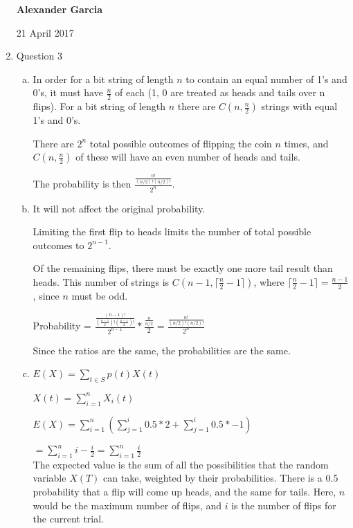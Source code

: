 \documentclass[11pt]{article}
\begin{document}
\begin{enumerate}
\begin{enumerate}[(a)]
			\end{enumerate}
\newpage
\textbf{Alexander Garcia}

21 April 2017 \\

		\item Question 3

			\begin{enumerate}[(a)]

				\item In order for a bit string of length $n$ to contain an equal number of 1's and 0's,
					it must have $\frac{n}{2}$ of each (1, 0 are treated as heads and tails over n flips).
					For a bit string of length $n$ there are $C(n, \frac{n}{2})$ strings with equal 1's and
					0's.

					There are $2^n$ total possible outcomes of flipping the coin $n$ times, and
					$C(n, \frac{n}{2})$ of these will have an even number of heads and tails.

					The probability is then $\frac{\frac{n!}{(n/2)!(n/2)!}}{2^n} $. \\

				\item It will not affect the original probability.

					Limiting the first flip to heads limits the number of total
					possible outcomes to $2^{n-1}$.

					Of the remaining flips, there must be exactly one more tail result than heads.
					This number of strings is $C(n-1, \lceil{\frac{n}{2} -1}\rceil)$, where
					$\lceil{\frac{n}{2} -1}\rceil = \frac{n-1}{2}$, since $n$ must be odd.

					Probability = $\frac{\frac{(n-1)!}{(\frac{n-1}{2})!(\frac{n-1}{2})!}}{2^{n-1}}
					* \frac{\frac{n}{n/2}}{2} = \frac{\frac{n!}{(n/2)!(n/2)!}}{2^n} $

					Since the ratios are the same, the probabilities are the same. \\

				\item $E(X) = \sum_{t \in S}{p(t)X(t)}$

					$X(t) = \sum_{i = 1}^{n}X_i(t)$

					$E(X) = \sum_{i = 1}^{n}{(\sum_{j = 1}^{i}{0.5 * 2} + \sum_{j = 1}^{i}{0.5 * -1})}$

					$=\sum_{i = 1}^{n}{i - \frac{i}{2} } = \sum_{i = 1}^{n}{\frac{i}{2} }$ \\

					The expected value is the sum of all the possibilities that the random variable $X(T)$ can take,
					weighted by their probabilities. There is a $0.5$ probability that a flip will come up heads, and the
					same for tails. Here, $n$ would be the maximum number of flips, and $i$ is the number of flips for
					the current trial.


\end{enumerate}
\end{enumerate}
\end{document}
